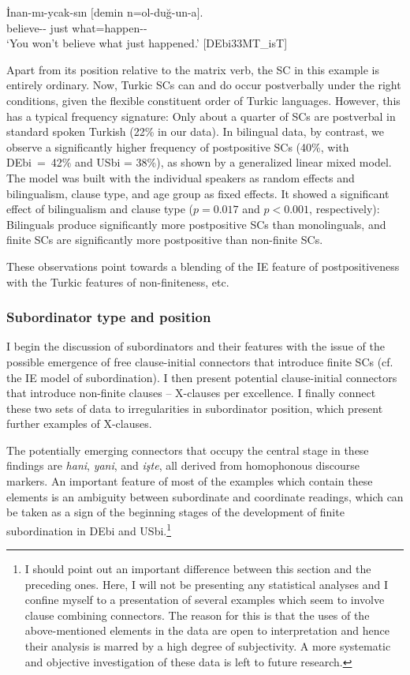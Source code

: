 \documentclass[output=paper,colorlinks,citecolor=brown]{langscibook}
\begin{document}
\ea\label{ex:keskin:postverbal}
\gll \.Inan-mı-ycak-sın $[$demin n=ol-duğ-un-a$]$.\\
believe-\Neg-\Sg{} \hphantom{[}just what=happen-\Sg-\Dat{}\\
\glt ‘You won’t believe what just happened.’ [DEbi33MT\_isT]
\z

\noindent
Apart from its position relative to the matrix verb, the SC in this example is entirely ordinary. Now, Turkic SCs can and do occur postverbally under the right conditions, given the flexible constituent order of Turkic languages. However, this has a typical frequency signature: Only about a quarter of SCs are postverbal in standard spoken Turkish (22\% in our data). In bilingual data, by contrast, we observe a significantly higher frequency of postpositive SCs (40\%, with DEbi~=~42\% and USbi = 38\%), as shown by a generalized linear mixed model. The model was built with the individual speakers as random effects and bilingualism, clause type, and age group as fixed effects. It showed a significant effect of bilingualism and clause type ($p = 0.017$ and $p < 0.001$, respectively): Bilinguals produce significantly more postpositive SCs than monolinguals, and finite SCs are significantly more postpositive than non-finite SCs.

These observations point towards a blending of the IE feature of postpositiveness with the Turkic features of non-finiteness, etc.

\subsubsection{Subordinator type and position}
\label{sec:keskin:sub_typ_pos}

I begin the discussion of subordinators and their features with the issue of the possible emergence of free clause-initial connectors that introduce finite SCs (cf. the IE model of subordination). I then present potential clause-initial connectors that introduce non-finite clauses -- X-clauses per excellence. I finally connect these two sets of data to irregularities in subordinator position, which present further examples of X-clauses.

The potentially emerging connectors that occupy the central stage in these findings are \textit{hani},  \textit{yani}, and \textit{işte}, all derived from homophonous discourse markers. An important feature of most of the examples which contain these elements is an ambiguity between subordinate and coordinate readings, which can be taken as a sign of the beginning stages of the development of finite subordination in DEbi and USbi.\footnote{I should point out an important difference between this section and the preceding ones. Here, I will not be presenting any statistical analyses and I confine myself to a presentation of several examples which seem to involve clause combining connectors. The reason for this is that the uses of the above-mentioned elements in the data are open to interpretation and hence their analysis is marred by a high degree of subjectivity. A more systematic and objective investigation of these data is left to future research.}
\end{document}
